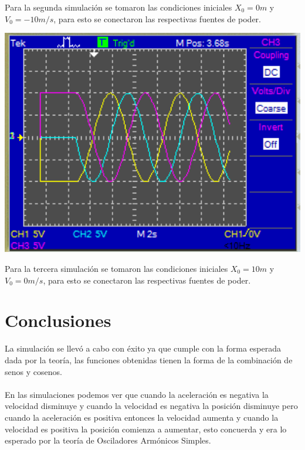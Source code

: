 \documentclass[DIV=calc, paper=a4, fontsize=11pt]{scrartcl}
\newenvironment{Figura}
  {\par\medskip\noindent\minipage{\linewidth}}
  {\endminipage\par\medskip}
\begin{document}
\begin{multicols}{2}
Para la segunda simulación se tomaron las condiciones iniciales $X_{0}=0m$ y $V_{0}=-10m/s$, para esto se conectaron las respectivas fuentes de poder.

\begin{Figura}
    \centering
    \includegraphics[width=1\textwidth]{Metodologia/SimulacionCondicionIniciales3.png}
    \label{fig}
\end{Figura}

Para la tercera simulación se tomaron las condiciones iniciales $X_{0}=10m$ y $V_{0}=0m/s$, para esto se conectaron las respectivas fuentes de poder.

\section*{Conclusiones}

La simulación se llevó a cabo con éxito ya que cumple con la forma esperada dada por la teoría, las funciones obtenidas tienen la forma de la combinación de senos y cosenos.
\\\\
En las simulaciones podemos ver que cuando la aceleración es negativa la velocidad disminuye y cuando la velocidad es negativa la posición disminuye pero cuando la aceleración es positiva entonces la velocidad aumenta y cuando la velocidad es positiva la posición comienza a aumentar, esto concuerda y era lo esperado por la teoría de Osciladores Armónicos Simples.
  
\begin{thebibliography}{99}


\end{thebibliography}
\end{multicols}
\end{document}
